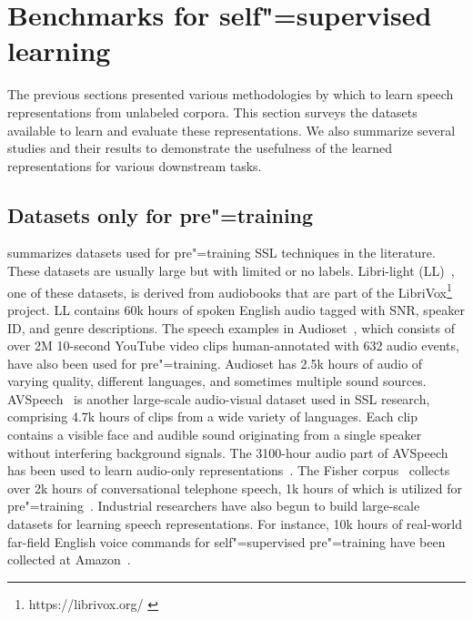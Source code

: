 
\section{Benchmarks for self"=supervised learning}
\label{section:benchmark}

The previous sections presented various methodologies by which to learn speech
representations from unlabeled corpora. This section surveys the datasets
available to learn and evaluate these representations. We also summarize
several studies and their results to demonstrate the usefulness of the learned
representations for various downstream tasks. 

\subsection{Datasets only for pre"=training} 
 summarizes datasets used for pre"=training SSL techniques
in the literature. These datasets are usually large but with limited or no
labels. Libri-light (LL)~\parencite{kahn_libri-light_2020}, one of these datasets, is
derived from audiobooks that are part of the
LibriVox\footnote{https://librivox.org/ \label{librivox}} project. LL contains
60k hours of spoken English audio tagged with SNR, speaker ID, and genre
descriptions. The speech examples in Audioset~\parencite{gemmeke_audio_2017}, which
consists of over 2M 10-second YouTube video clips human-annotated with 632
audio events, have also been used for pre"=training. Audioset has 2.5k hours
of audio of varying quality, different languages, and sometimes multiple sound
sources. AVSpeech~\parencite{ephrat_looking_2018} is another large-scale audio-visual
dataset used in SSL research, comprising 4.7k hours of clips from a wide
variety of languages. 
Each clip contains a visible face and audible sound originating from a single
speaker without interfering background signals. The 3100-hour audio part of
AVSpeech has been used to learn audio-only 
representations~\parencite{kawakami_learning_2020}. The Fisher corpus~\parencite{cieri_fisher_2004} collects
over 2k hours of conversational telephone speech, 1k hours of which is utilized
for pre"=training~\parencite{jiang_further_2021}. Industrial researchers have also
begun to build large-scale datasets for learning speech representations.
For instance, 10k hours of real-world far-field English voice commands for
self"=supervised pre"=training have been collected at 
Amazon~\parencite{sadhu_wav2vecc_2021}. 

